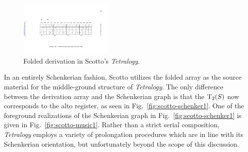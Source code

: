 \begin{example}
	\begin{figure}[htbp]
    	\centering
		\includegraphics[width=1.8in, angle=270]{figures/scotto-folded.pdf}
		\caption[Folded derivation in Scotto's \emph{Tetralogy}]{Folded derivation in Scotto's \emph{Tetralogy}.}
    	\label{fig:scotto-folded}
	\end{figure}
	
	\noindent In an entirely Schenkerian fashion, Scotto utilizes the folded array as the source material for the middle-ground structure of \emph{Tetralogy}. The only difference between the derivation array and the Schenkerian graph is that the $\operatorname{T}_2(S)$ now corresponds to the alto register, as seen in Fig.~\ref{fig:scotto-schenker1}. One of the foreground realizations of the Schenkerian graph in Fig.~\ref{fig:scotto-schenker1} is given in Fig.~\ref{fig:scotto-music1}. Rather than a strict serial composition, \emph{Tetralogy} employs a variety of prolongation procedures which are in line with its Schenkerian orientation, but unfortunately beyond the scope of this discussion.
	

\end{example}
